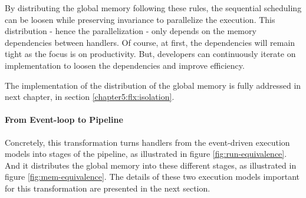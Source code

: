 \separator

By distributing the global memory following these rules, the sequential scheduling can be loosen while preserving invariance to parallelize the execution.
This distribution - hence the parallelization - only depends on the memory dependencies between handlers.
Of course, at first, the dependencies will remain tight as the focus is on productivity.
But, developers can continuously iterate on implementation to loosen the dependencies and improve efficiency.

The implementation of the distribution of the global memory is fully addressed in next chapter, in section \ref{chapter5:flx:isolation}.
















\paragraph{From Event-loop to Pipeline}

Concretely, this transformation turns handlers from the event-driven execution models into stages of the pipeline, as illustrated in figure \ref{fig:run-equivalence}.
And it distributes the global memory  into these different stages, as illustrated in figure \ref{fig:mem-equivalence}.
The details of these two execution models important for this transformation are presented in the next section.

